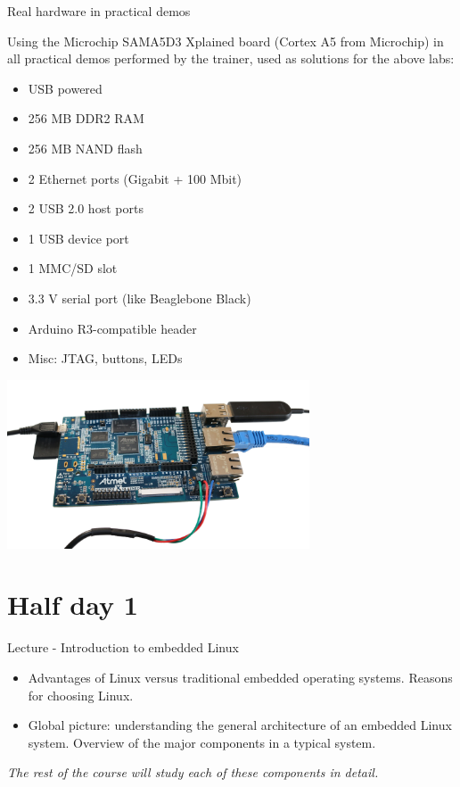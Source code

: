 \documentclass[a4paper,12pt,obeyspaces,spaces,hyphens]{article}
\begin{document}
\feagendatwocolumn
{Real hardware in practical demos}
{
  Using the Microchip SAMA5D3 Xplained board (Cortex A5 from
  Microchip) in all practical demos performed by the trainer,
  used as solutions for the above labs:

  \begin{itemize}
  \item USB powered
  \item 256 MB DDR2 RAM
  \item 256 MB NAND flash
  \item 2 Ethernet ports (Gigabit + 100 Mbit)
  \item 2 USB 2.0 host ports
  \item 1 USB device port
  \item 1 MMC/SD slot
  \item 3.3 V serial port (like Beaglebone Black)
  \item Arduino R3-compatible header
  \item Misc: JTAG, buttons, LEDs
  \end{itemize}
}
{}
{
  \begin{center}
    \includegraphics[height=5cm]{../slides/xplained-board/xplained-board.png}
  \end{center}
}

\section{Half day 1}

\feagendaonecolumn
{Lecture - Introduction to embedded Linux}
{
  \begin{itemize}
  \item Advantages of Linux versus traditional embedded operating systems.
        Reasons for choosing Linux.
  \item Global picture: understanding the general architecture of an
        embedded Linux system. Overview of the major components in a typical
        system.
  \end{itemize}
  {\em The rest of the course will study each of these components in detail.}
}
\end{document}
